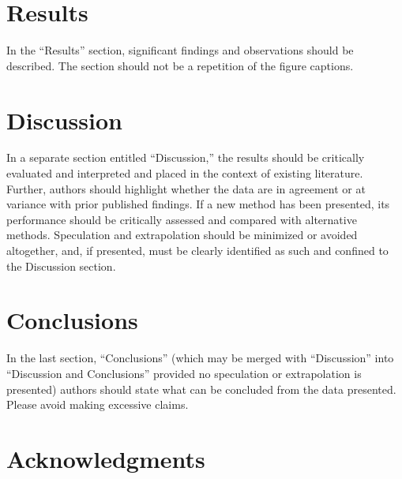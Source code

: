\documentclass[11pt]{article}
\begin{document}
\section{Results}

In the “Results” section, significant findings and observations should be described. The section should not be a repetition of the figure captions.



\section{Discussion}

In a separate section entitled “Discussion,” the results should be critically evaluated and interpreted and placed in the context of existing literature. Further, authors should highlight whether the data are in agreement or at variance with prior published findings. If a new method has been presented, its performance should be critically assessed and compared with alternative methods. Speculation and extrapolation should be minimized or avoided altogether, and, if presented, must be clearly identified as such and confined to the Discussion section.



\section{Conclusions}

In the last section, “Conclusions” (which may be merged with “Discussion” into “Discussion and Conclusions” provided no speculation or extrapolation is presented) authors should state what can be concluded from the data presented. Please avoid making excessive claims.



\section{Acknowledgments}
\end{document}
